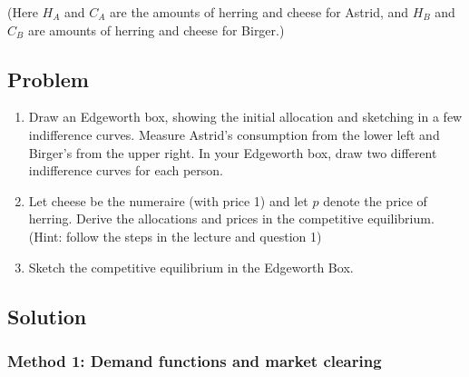 \documentclass[12pt]{article}
\begin{document}
\noindent
(Here \(H_A\) and \(C_A\) are the amounts of herring and cheese for Astrid, and \(H_B\) and \(C_B\) are amounts of herring and cheese for Birger.)

\subsection{Problem}
\begin{enumerate}[label=(\alph*)]
    \item Draw an Edgeworth box, showing the initial allocation and sketching in a few indifference curves. Measure Astrid's consumption from the lower left and Birger's from the upper right. In your Edgeworth box, draw two different indifference curves for each person.
    \item Let cheese be the numeraire (with price 1) and let \(p\) denote the price of herring. Derive the allocations and prices in the competitive equilibrium. (Hint: follow the steps in the lecture and question 1)
    \item Sketch the competitive equilibrium in the Edgeworth Box.
\end{enumerate}

\newpage
\subsection{Solution}

\subsubsection{Method 1: Demand functions and market clearing}
\end{document}
